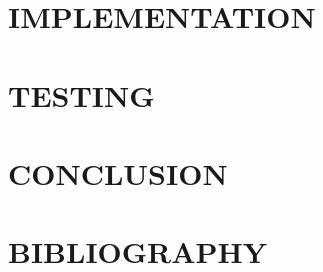 \section{IMPLEMENTATION}


\clearpage
\section{TESTING}


\clearpage
\section{CONCLUSION}




\clearpage
\section{BIBLIOGRAPHY}
\printbibliography[heading=none]

\clearpage
\renewcommand{\listfigurename}{LIST OF FIGURES}
\listoffigures

\clearpage
\renewcommand{\listtablename}{LIST OF TABLES}
\listoftables

\clearpage


